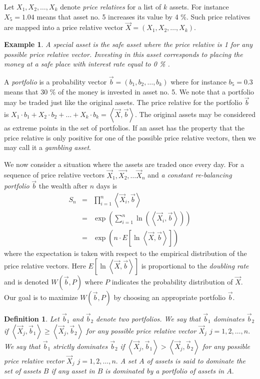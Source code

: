 \documentclass[10pt,a4paper,draft]{article}
\newtheorem{Definition}{Definition}
\newtheorem{Example}{Example}
\begin{document}
Let $X_{1},X_{2},\dots,X_{k}$ denote \emph{price relatives} for
a list of $k$ assets. For instance $X_{5}=1.04$ means that asset
no. 5 increases its value by 4 \%. Such price relatives are mapped
into a price relative vector
$\vec{X}=\left(X_{1},X_{2},\dots,X_{k}\right).$
\begin{Example}
A special asset is the \emph{safe asset} where the price
relative is 1 for any possible price relative vector. Investing in this
asset corresponds to placing the money at a safe place with interest
rate equal to 0 \% .
\end{Example}
A \emph{portfolio} is a probability vector
$\vec{b}=\left(b_{1},b_{2},\dots,b_{k}\right)$
where for instance $b_{5}=0.3$ means that 30 \% of the money is
invested in asset no. 5. We note that a portfolio may be traded just like
the original assets. The price relative for the portfolio $\vec{b}$
is $X_{1}\cdot b_{1}+X_{2}\cdot b_{2}+\dots+X_{k}\cdot
b_{k}=\left\langle \vec{X},\vec{b}\right\rangle .$
The original assets may be considered as extreme points in the
set of portfolios. If an asset has the property that the price
relative is only positive for one of the possible price relative vectors,
then we may call it a \emph{gambling asset}. 

We now consider a situation where the assets are traded once
every day. For a sequence of price relative vectors
$\vec{X}_{1},\vec{X_{2}},\dots\vec{X}_{n}$
and \emph{a constant re-balancing portfolio} $\vec{b}$ the
wealth after $n$ days is
\begin{eqnarray}
S_{n} & = & \prod_{i=1}^{n}\left\langle
\vec{X}_{i},\vec{b}\right\rangle \\
& = & \exp\left(\sum_{i=1}^{n}\ln\left(\left\langle
\vec{X}_{i},\vec{b}\right\rangle \right)\right)\\
& = & \exp\left(n\cdot E\left[\ln\left\langle
\vec{X},\vec{b}\right\rangle \right]\right)
\end{eqnarray}
where the expectation is taken with respect to the empirical
distribution of the price relative vectors. Here $E\left[\ln\left\langle
\vec{X},\vec{b}\right\rangle \right]$
is proportional to the \emph{doubling rate} and is denoted
$W\left(\vec{b},P\right)$
where $P$ indicates the probability distribution of $\vec{X}$.
Our goal is to maximize $W\left(\vec{b},P\right)$ by choosing an
appropriate portfolio $\vec{b}.$

\begin{Definition}
Let $\vec{b}_{1}$ and $\vec{b}_{2}$ denote two portfolios. We
say
that $\vec{b}_{1}$ \emph{dominates} $\vec{b}_{2}$ if
$\left\langle \vec{X}_{j},\vec{b}_{1}\right\rangle
\geq\left\langle
\vec{X}_{j},\vec{b}_{2}\right\rangle $
for any possible price relative vector $\vec{X}_{j}$
$j=1,2,\dots,n.$
We say that $\vec{b}_{1}$ \emph{strictly dominates}
$\vec{b}_{2}$
if $\left\langle \vec{X}_{j},\vec{b}_{1}\right\rangle
>\left\langle \vec{X}_{j},\vec{b}_{2}\right\rangle $
for any possible price relative vector $\vec{X}_{j}$
$j=1,2,\dots,n.$ 
A set $A$ of assets is said to dominate the set of assets $B$ if any asset in $B$ is dominated by a portfolio of assets in $A.$
\end{Definition}
\end{document}
